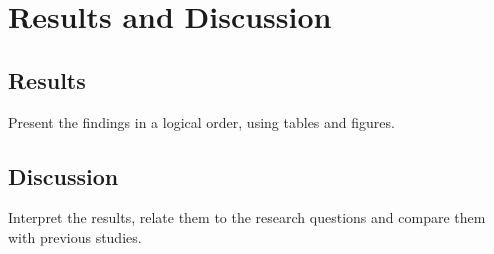 \chapter{Results and Discussion}
\label{chap:results}

\section{Results}
Present the findings in a logical order, using tables and figures.

\section{Discussion}
Interpret the results, relate them to the research questions and compare them with previous studies.
